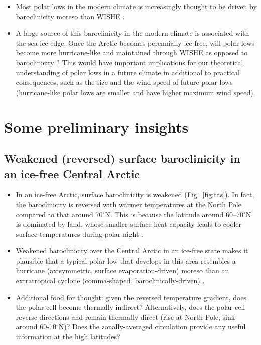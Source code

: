 \documentclass{article}
\begin{document}
\begin{itemize}
    \item Most polar lows in the modern climate is increasingly thought to be driven by baroclinicity \citep[similar to midlatitude extratropical cyclones, e.g.][]{kolstad2016, stoll2021} moreso than WISHE \citep[similar to tropical cyclones, e.g.][]{emanuel1989}.
    \item A large source of this baroclinicity in the modern climate is associated with the sea ice edge. Once the Arctic becomes perennially ice-free, will polar lows become more hurricane-like and maintained through WISHE as opposed to baroclinicity \citep[i.e., more like the M0 vs M3 storm in the simulations of][]{yanase2005, yanase2007}? This would have important implications for our theoretical understanding of polar lows in a future climate in additional to practical consequences, such as the size and the wind speed of future polar lows (hurricane-like polar lows are smaller and have higher maximum wind speed).
\end{itemize}

\section{Some preliminary insights}
\subsection{Weakened (reversed) surface baroclinicity in an ice-free Central Arctic}
\begin{itemize}
    \item In an ice-free Arctic, surface baroclinicity is weakened (Fig.~\ref{fig:tas}). In fact, the baroclinicity is reversed with warmer temperatures at the North Pole compared to that around 70$^\circ$N. This is because the latitude around 60--70$^\circ$N is dominated by land, whose smaller surface heat capacity leads to cooler surface temperatures during polar night \citep{burt2016, henry2021}.
    \item Weakened baroclinicity over the Central Arctic in an ice-free state makes it plausible that a typical polar low that develops in this area resembles a hurricane (axisymmetric, surface evaporation-driven) moreso than an extratropical cyclone (comma-shaped, baroclinically-driven) \cite{yanase2005,yanase2007}.
    \item Additional food for thought: given the reversed temperature gradient, does the polar cell become thermally indirect? Alternatively, does the polar cell reverse directions and remain thermally direct (rise at North Pole, sink around 60-70$^\circ$N)? Does the zonally-averaged circulation provide any useful information at the high latitudes?
\end{itemize}
\end{document}
